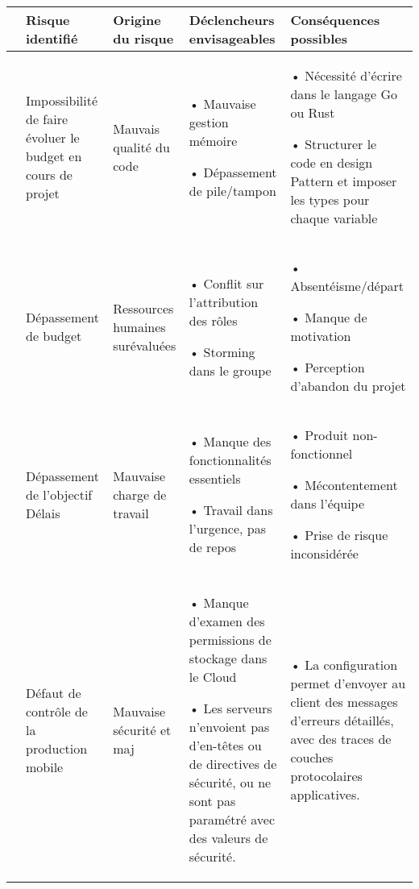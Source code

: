 \documentclass[12pt]{article}
\begin{document}
\begin{landscape}
\begin{table}[H]
\scriptsize
\begin{tabular}{p{.1cm}p{}p{3.5cm}p{6.75cm} p{6.75cm}}
\hline & Risque identifié & \bf Origine du risque & \bf Déclencheurs envisageables & \bf Conséquences possibles \\
\hline

\cellcolor{violet!75} & Impossibilité de faire évoluer le budget en cours de projet & Mauvais qualité du code\cellcolor{green!50} & 

{•} Mauvaise gestion mémoire
			
{•} Dépassement de pile/tampon
\cellcolor{blue!50}
 & 
{•} Nécessité d’écrire dans le langage Go ou Rust

{•} Structurer le code en design Pattern et imposer les types pour chaque variable
\cellcolor{red!50}\\
\hline
\cellcolor{red!75} & Dépassement de budget & Ressources humaines surévaluées\cellcolor{green!50} & 

{•} Conflit sur l’attribution des rôles

{•} Storming dans le groupe
\cellcolor{blue!50}
& 
{•} Absentéisme/départ

{•} Manque de motivation

{•} Perception d’abandon du projet

 \cellcolor{red!50}\\
\hline
\cellcolor{orange!75} & Dépassement de l’objectif Délais & Mauvaise charge de travail\cellcolor{green!50} & 

{•} Manque des fonctionnalités essentiels

{•} Travail dans l’urgence, pas de repos
\cellcolor{blue!50}
& 
{•} Produit non-fonctionnel

{•} Mécontentement dans l’équipe

{•} Prise de risque inconsidérée

 \cellcolor{red!50}\\
\hline
\cellcolor{yellow!75} & Défaut de contrôle de la production mobile & Mauvaise sécurité et maj\cellcolor{green!50} & 

{•} Manque d’examen des permissions de stockage dans le Cloud

{•} Les serveurs n’envoient pas d’en-têtes ou de directives de sécurité, ou ne sont pas paramétré avec des valeurs de sécurité.
\cellcolor{blue!50}
& 
{•} La configuration permet d’envoyer au client des messages d’erreurs détaillés, avec des traces de couches protocolaires applicatives.


\end{tabular}
\end{table}
\end{landscape}
\end{document}

